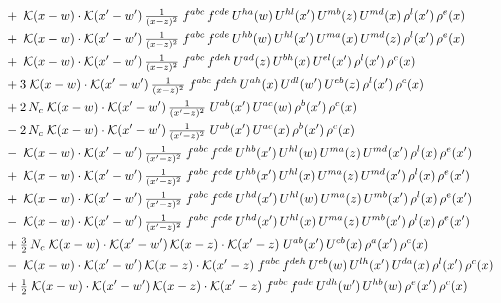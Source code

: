 \documentclass[10pt]{article}
\numberwithin{equation}{section}
\begin{document}
\begin{align}
&\quad +\;\mathcal{K}(x-w)\cdot\mathcal{K}(x'-w')\,\tfrac{1}{(x-z)^{2}}\;f^{abc}\,f^{cde}\,U^{ha}(w)\,U^{hl}(x')\,U^{mb}(z)\,U^{md}(x)\,\rho^{l}(x')\,\rho^{e}(x)\notag\\
&\quad +\;\mathcal{K}(x-w)\cdot\mathcal{K}(x'-w')\,\tfrac{1}{(x-z)^{2}}\;f^{abc}\,f^{cde}\,U^{hb}(w)\,U^{hl}(x')\,U^{ma}(x)\,U^{md}(z)\,\rho^{l}(x')\,\rho^{e}(x)\notag\\
&\quad +\;\mathcal{K}(x-w)\cdot\mathcal{K}(x'-w')\,\tfrac{1}{(x-z)^{2}}\;f^{abc}\,f^{deh}\,U^{ad}(z)\,U^{bh}(x)\,U^{el}(x')\,\rho^{l}(x')\,\rho^{c}(x)\notag\\
&\quad +3\;\mathcal{K}(x-w)\cdot\mathcal{K}(x'-w')\,\tfrac{1}{(x-z)^{2}}\;f^{abc}\,f^{deh}\,U^{ah}(x)\,U^{dl}(w')\,U^{eb}(z)\,\rho^{l}(x')\,\rho^{c}(x)\notag\\
&\quad +2\,N_c\;\mathcal{K}(x-w)\cdot\mathcal{K}(x'-w')\,\tfrac{1}{(x'-z)^{2}}\;U^{ab}(x')\,U^{ac}(w)\,\rho^{b}(x')\,\rho^{c}(x)\notag\\
&\quad -2\,N_c\;\mathcal{K}(x-w)\cdot\mathcal{K}(x'-w')\,\tfrac{1}{(x'-z)^{2}}\;U^{ab}(x')\,U^{ac}(x)\,\rho^{b}(x')\,\rho^{c}(x)\notag\\
&\quad -\;\mathcal{K}(x-w)\cdot\mathcal{K}(x'-w')\,\tfrac{1}{(x'-z)^{2}}\;f^{abc}\,f^{cde}\,U^{hb}(x')\,U^{hl}(w)\,U^{ma}(z)\,U^{md}(x')\,\rho^{l}(x)\,\rho^{e}(x')\notag\\
&\quad +\;\mathcal{K}(x-w)\cdot\mathcal{K}(x'-w')\,\tfrac{1}{(x'-z)^{2}}\;f^{abc}\,f^{cde}\,U^{hb}(x')\,U^{hl}(x)\,U^{ma}(z)\,U^{md}(x')\,\rho^{l}(x)\,\rho^{e}(x')\notag\\
&\quad +\;\mathcal{K}(x-w)\cdot\mathcal{K}(x'-w')\,\tfrac{1}{(x'-z)^{2}}\;f^{abc}\,f^{cde}\,U^{hd}(x')\,U^{hl}(w)\,U^{ma}(z)\,U^{mb}(x')\,\rho^{l}(x)\,\rho^{e}(x')\notag\\
&\quad -\;\mathcal{K}(x-w)\cdot\mathcal{K}(x'-w')\,\tfrac{1}{(x'-z)^{2}}\;f^{abc}\,f^{cde}\,U^{hd}(x')\,U^{hl}(x)\,U^{ma}(z)\,U^{mb}(x')\,\rho^{l}(x)\,\rho^{e}(x')\notag\\
&\quad +\tfrac{3}{2}\,N_c\;\mathcal{K}(x-w)\cdot\mathcal{K}(x'-w')\,\mathcal{K}(x-z)\cdot\mathcal{K}(x'-z)\;U^{ab}(x')\,U^{cb}(x)\,\rho^{a}(x')\,\rho^{c}(x)\notag\\
&\quad -\;\mathcal{K}(x-w)\cdot\mathcal{K}(x'-w')\,\mathcal{K}(x-z)\cdot\mathcal{K}(x'-z)\;f^{abc}\,f^{deh}\,U^{eb}(w)\,U^{lh}(x')\,U^{da}(x)\,\rho^{l}(x')\,\rho^{c}(x)\notag\\
&\quad +\tfrac{1}{2}\;\mathcal{K}(x-w)\cdot\mathcal{K}(x'-w')\,\mathcal{K}(x-z)\cdot\mathcal{K}(x'-z)\;f^{abc}\,f^{ade}\,U^{dh}(w')\,U^{hb}(w)\,\rho^{e}(x')\,\rho^{c}(x)\notag\\

\end{align}
\end{document}
